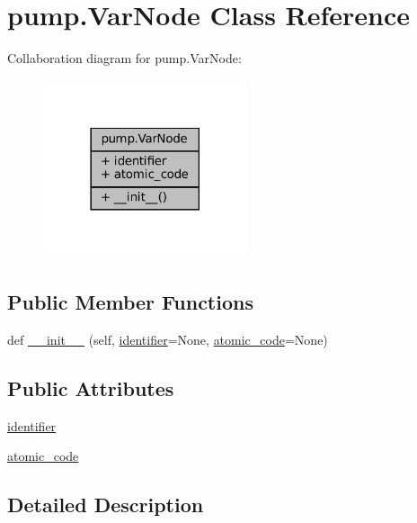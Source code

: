 \hypertarget{classpump_1_1VarNode}{}\section{pump.\+Var\+Node Class Reference}
\label{classpump_1_1VarNode}


Collaboration diagram for pump.\+Var\+Node\+:
\nopagebreak
\begin{figure}[H]
\begin{center}
\leavevmode
\includegraphics[width=170pt]{classpump_1_1VarNode__coll__graph}
\end{center}
\end{figure}
\subsection*{Public Member Functions}
\begin{DoxyCompactItemize}
\item 
def \hyperlink{classpump_1_1VarNode_adf79bf21b1db5367792a4ac91f94a756}{\+\_\+\+\_\+init\+\_\+\+\_\+} (self, \hyperlink{classpump_1_1VarNode_aa2b634e2443646c3754f2d193efa4dc7}{identifier}=None, \hyperlink{classpump_1_1VarNode_ad6bef6a8577b994fbe9ccddf3c82d2fc}{atomic\+\_\+code}=None)
\end{DoxyCompactItemize}
\subsection*{Public Attributes}
\begin{DoxyCompactItemize}
\item 
\hyperlink{classpump_1_1VarNode_aa2b634e2443646c3754f2d193efa4dc7}{identifier}
\item 
\hyperlink{classpump_1_1VarNode_ad6bef6a8577b994fbe9ccddf3c82d2fc}{atomic\+\_\+code}
\end{DoxyCompactItemize}


\subsection{Detailed Description}


